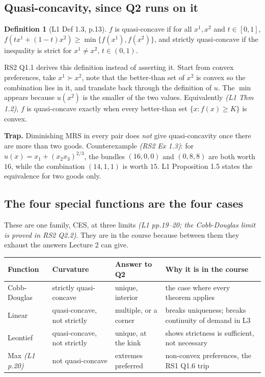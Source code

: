 \documentclass[11pt]{article}
\theoremstyle{definition}
\newtheorem{definition}{Definition}
\newenvironment{keybox}{\begin{snugshade}\noindent\ignorespaces}{\end{snugshade}}
\newcommand{\src}[1]{\textit{\small (#1)}}
\begin{document}
\subsection{Quasi-concavity, since Q2 runs on it}

\begin{definition}[L1 Def 1.3, p.13]
$f$ is quasi-concave if for all $x^1,x^2$ and $t\in[0,1]$,
$f(tx^1+(1-t)x^2)\ge\min\{f(x^1),f(x^2)\}$, and strictly quasi-concave if the inequality is
strict for $x^1\ne x^2$, $t\in(0,1)$.
\end{definition}

RS2 Q1.1 derives this definition instead of asserting it. Start from convex preferences,
take $x^1\succ x^2$, note that the better-than set of $x^2$ is convex so the combination
lies in it, and translate back through the definition of $u$. The $\min$ appears because
$u(x^2)$ is the smaller of the two values. Equivalently \src{L1 Thm 1.2}, $f$ is
quasi-concave exactly when every better-than set $\{x: f(x)\ge K\}$ is convex.

\begin{keybox}
\textbf{Trap.} Diminishing MRS in every pair does \emph{not} give quasi-concavity once
there are more than two goods. Counterexample \src{RS2 Ex 1.3}: for
$u(x)=x_1+(x_2x_3)^{2/3}$, the bundles $(16,0,0)$ and $(0,8,8)$ are both worth $16$, while
the combination $(14,1,1)$ is worth $15$. L1 Proposition 1.5 states the equivalence for two
goods only.
\end{keybox}

\subsection{The four special functions are the four cases}

These are one family, CES, at three limits \src{L1 pp.19--20; the Cobb-Douglas limit is
proved in RS2 Q2.2}. They are in the course because between them they exhaust the answers
Lecture 2 can give.

\begin{center}
\begin{tabular}{@{}p{2.7cm}p{3.3cm}p{3.2cm}p{5.0cm}@{}}
\toprule
\textbf{Function} & \textbf{Curvature} & \textbf{Answer to Q2} & \textbf{Why it is in the course} \\
\midrule
Cobb-Douglas & strictly quasi-concave & unique, interior & the case where every theorem applies \\[3pt]
Linear & quasi-concave, not strictly & multiple, or a corner & breaks uniqueness; breaks continuity of demand in L3 \\[3pt]
Leontief & quasi-concave, not strictly & unique, at the kink & shows strictness is sufficient, not necessary \\[3pt]
Max \src{L1 p.20} & not quasi-concave & extremes preferred & non-convex preferences, the RS1 Q1.6 trip \\
\bottomrule
\end{tabular}
\end{center}
\end{document}
